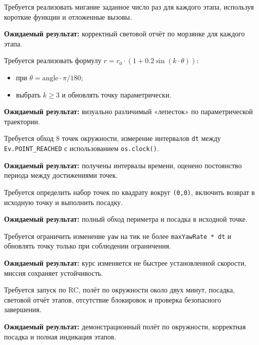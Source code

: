 \begin{taskbox}
Требуется реализовать мигание заданное число раз для каждого этапа, используя короткие функции и отложенные вызовы.

\textbf{Ожидаемый результат:} корректный световой отчёт по морзянке для каждого этапа.
\end{taskbox}

\begin{taskbox}
Требуется реализовать формулу \(r = r_0 \cdot (1 + 0.2 \sin(k \cdot \theta))\):
\begin{itemize}
    \item при \(\theta = \text{angle} \cdot \pi / 180\);
    \item выбрать \(k \ge 3\) и обновлять точку параметрически.
\end{itemize}

\textbf{Ожидаемый результат:} визуально различимый «лепесток» по параметрической траектории.
\end{taskbox}

\begin{taskbox}
Требуется обход 8 точек окружности, измерение интервалов \texttt{dt} между \texttt{Ev.POINT\_REACHED} с использованием \texttt{os.clock()}.

\textbf{Ожидаемый результат:} получены интервалы времени, оценено постоянство периода между достижениями точек.
\end{taskbox}

\begin{taskbox}
Требуется определить набор точек по квадрату вокруг \texttt{(0,0)}, включить возврат в исходную точку и выполнить посадку.

\textbf{Ожидаемый результат:} полный обход периметра и посадка в исходной точке.
\end{taskbox}

\begin{taskbox}
Требуется ограничить изменение \texttt{yaw} на тик не более \texttt{maxYawRate * dt} и обновлять точку только при соблюдении ограничения.

\textbf{Ожидаемый результат:} курс изменяется не быстрее установленной скорости, миссия сохраняет устойчивость.
\end{taskbox}

\begin{taskbox}
Требуется запуск по RC, полёт по окружности около двух минут, посадка, световой отчёт этапов, отсутствие блокировок и проверка безопасного завершения.

\textbf{Ожидаемый результат:} демонстрационный полёт по окружности, корректная посадка и полная индикация этапов.
\end{taskbox}
